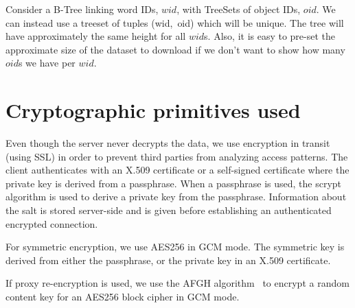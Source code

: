\documentclass[notitlepage,longbibliography]{revtex4-1}
\begin{document}
Consider a B-Tree linking word IDs, $wid$, with TreeSets of object IDs, $oid$.
We can instead use a treeset of tuples (wid,~oid) which will be unique.
The tree will have approximately the same height for all $wid$s.
Also, it is easy to pre-set the approximate size of the dataset to download if we don't want to show how many $oid$s we have per $wid$.

\section{Cryptographic primitives used}

Even though the server never decrypts the data, we use encryption in transit (using SSL) in order to prevent third parties from analyzing access patterns.
The client authenticates with an X.509 certificate or a self-signed certificate where the private key is derived from a passphrase.
When a passphrase is used, the scrypt algorithm is used to derive a private key from the passphrase. Information about the salt is stored server-side and is given before establishing an authenticated encrypted connection.

For symmetric encryption, we use AES256 in GCM mode.
The symmetric key is derived from either the passphrase, or the private key in an X.509 certificate.

If proxy re-encryption is used, we use the AFGH algorithm~\cite{afgh} to encrypt a random content key for an AES256 block cipher in GCM mode.


\end{document}
